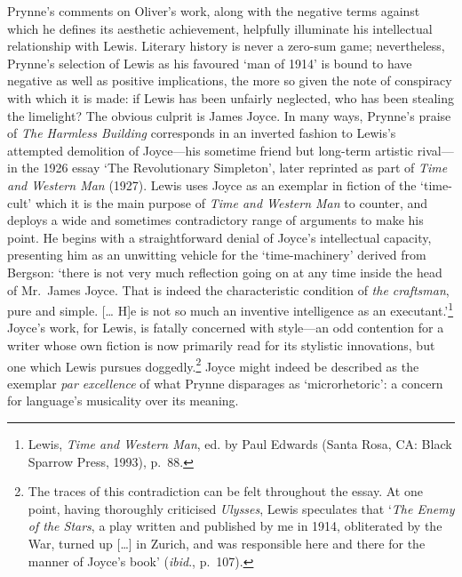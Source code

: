 \documentclass[]{article}
\begin{document}
Prynne’s comments on Oliver’s work, along with the negative terms
against which he defines its aesthetic achievement, helpfully illuminate
his intellectual relationship with Lewis. Literary history is never a
zero-sum game; nevertheless, Prynne’s selection of Lewis as his favoured
‘man of 1914’ is bound to have negative as well as positive
implications, the more so given the note of conspiracy with which it is
made: if Lewis has been unfairly neglected, who has been stealing the
limelight? The obvious culprit is James Joyce. In many ways, Prynne’s
praise of \emph{The Harmless Building} corresponds in an inverted
fashion to Lewis’s attempted demolition of Joyce—his sometime friend but
long-term artistic rival—in the 1926 essay ‘The Revolutionary
Simpleton’, later reprinted as part of \emph{Time and Western Man}
(1927). Lewis uses Joyce as an exemplar in fiction of the ‘time-cult’
which it is the main purpose of \emph{Time and Western Man} to counter,
and deploys a wide and sometimes contradictory range of arguments to
make his point. He begins with a straightforward denial of Joyce’s
intellectual capacity, presenting him as an unwitting vehicle for the
‘time-machinery’ derived from Bergson: ‘there is not very much
reflection going on at any time inside the head of Mr.~James Joyce. That
is indeed the characteristic condition of \emph{the craftsman}, pure and
simple. {[}\ldots{} H{]}e is not so much an inventive intelligence as an
executant.’\footnote{Lewis, \emph{Time and Western Man}, ed. by Paul
  Edwards (Santa Rosa, CA: Black Sparrow Press, 1993), p.~88.} Joyce’s
work, for Lewis, is fatally concerned with style—an odd contention for a
writer whose own fiction is now primarily read for its stylistic
innovations, but one which Lewis pursues doggedly.\footnote{The traces
  of this contradiction can be felt throughout the essay. At one point,
  having thoroughly criticised \emph{Ulysses}, Lewis speculates that
  ‘\emph{The Enemy of the Stars}, a play written and published by me in
  1914, obliterated by the War, turned up {[}\ldots{}{]} in Zurich, and
  was responsible here and there for the manner of Joyce’s book’
  (\emph{ibid}., p.~107).} Joyce might indeed be described as the
exemplar \emph{par excellence} of what Prynne disparages as
‘microrhetoric’: a concern for language’s musicality over its meaning.
\end{document}
